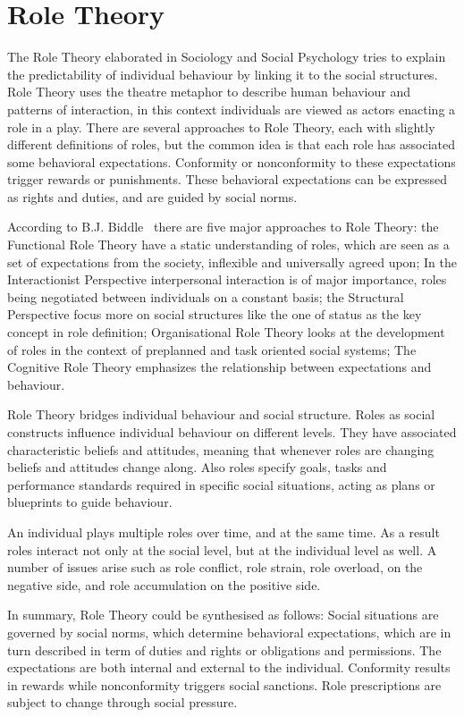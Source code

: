 \documentclass[a4paper,12pt,oneside,fleqn]{book} %
\begin{document}
\section{Role Theory} %

The Role Theory elaborated in Sociology and Social Psychology tries to
explain the predictability of individual behaviour by linking it to the
social structures. Role Theory uses the theatre metaphor to describe human
behaviour and patterns of interaction, in this context individuals are
viewed as actors enacting a role in a play. There are several approaches to
Role Theory, each with slightly different definitions of roles, but the
common idea is that each role has associated some behavioral expectations.
Conformity or nonconformity to these expectations trigger rewards or
punishments. These behavioral expectations can be expressed as rights and
duties, and are guided by social norms.

According to B.J. Biddle~\cite{biddle1986recent} there are five major
approaches to Role Theory: the Functional Role Theory have a static
understanding of roles, which are seen as a set of expectations from the
society, inflexible and universally agreed upon; In the Interactionist
Perspective interpersonal interaction is of major importance, roles being
negotiated between individuals on a constant basis; the Structural
Perspective focus more on social structures like the one of status as the
key concept in role definition; Organisational Role Theory looks at the
development of roles in the context of preplanned and task oriented social
systems; The Cognitive Role Theory emphasizes the relationship between
expectations and behaviour.

Role Theory bridges individual behaviour and social structure. Roles as
social constructs influence individual behaviour on different levels. They
have associated characteristic beliefs and attitudes, meaning that whenever
roles are changing beliefs and attitudes change along. Also roles specify
goals, tasks and performance standards required in specific social
situations, acting as plans or blueprints to guide behaviour.

An individual plays multiple roles over time, and at the same time. As a
result roles interact not only at the social level, but at the individual
level as well. A number of issues arise such as role conflict, role strain,
role overload, on the negative side, and role accumulation on the positive
side.

In summary, Role Theory could be synthesised as follows: Social situations
are governed by social norms, which determine behavioral expectations,
which are in turn described in term of duties and rights or obligations and
permissions. The expectations are both internal and external to the
individual. Conformity results in rewards while nonconformity triggers
social sanctions. Role prescriptions are subject to change through social
pressure.
\end{document}
